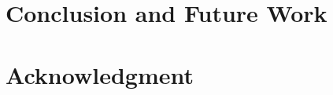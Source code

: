 \documentclass[journal]{IEEEtran}
\begin{document}
\section{Conclusion and Future Work}

\label{sec:Conclusion and Future Work}

\section*{Acknowledgment}

\label{sec:Acknowledgment}


\ifCLASSOPTIONcaptionsoff
  \newpage
\fi




% 

\end{document}
